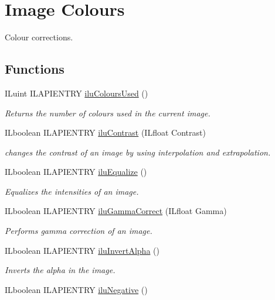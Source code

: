\hypertarget{group__ilu__colour}{\section{Image Colours}
\label{group__ilu__colour}
}


Colour corrections.  


\subsection*{Functions}
\begin{DoxyCompactItemize}
\item 
I\-Luint I\-L\-A\-P\-I\-E\-N\-T\-R\-Y \hyperlink{group__ilu__colour_ga1c019783a7ab60a1b9fee1ed5b2aadbe}{ilu\-Colours\-Used} ()
\begin{DoxyCompactList}\small\item\em Returns the number of colours used in the current image. \end{DoxyCompactList}\item 
I\-Lboolean I\-L\-A\-P\-I\-E\-N\-T\-R\-Y \hyperlink{group__ilu__colour_ga674c6a79168815f579338c30e94cd086}{ilu\-Contrast} (I\-Lfloat Contrast)
\begin{DoxyCompactList}\small\item\em changes the contrast of an image by using interpolation and extrapolation. \end{DoxyCompactList}\item 
I\-Lboolean I\-L\-A\-P\-I\-E\-N\-T\-R\-Y \hyperlink{group__ilu__colour_ga5543086bca10106a064d3dce59770312}{ilu\-Equalize} ()
\begin{DoxyCompactList}\small\item\em Equalizes the intensities of an image. \end{DoxyCompactList}\item 
I\-Lboolean I\-L\-A\-P\-I\-E\-N\-T\-R\-Y \hyperlink{group__ilu__colour_ga06739004ee4930a65ebf57354060095a}{ilu\-Gamma\-Correct} (I\-Lfloat Gamma)
\begin{DoxyCompactList}\small\item\em Performs gamma correction of an image. \end{DoxyCompactList}\item 
I\-Lboolean I\-L\-A\-P\-I\-E\-N\-T\-R\-Y \hyperlink{group__ilu__colour_ga0e3910809ea18e77a83cee05e12613ef}{ilu\-Invert\-Alpha} ()
\begin{DoxyCompactList}\small\item\em Inverts the alpha in the image. \end{DoxyCompactList}\item 
\hypertarget{group__ilu__colour_ga9606e892974b44e5457bc6f95de0970d}{I\-Lboolean I\-L\-A\-P\-I\-E\-N\-T\-R\-Y \hyperlink{group__ilu__colour_ga9606e892974b44e5457bc6f95de0970d}{ilu\-Negative} ()}\label{group__ilu__colour_ga9606e892974b44e5457bc6f95de0970d}


\end{DoxyCompactItemize}
